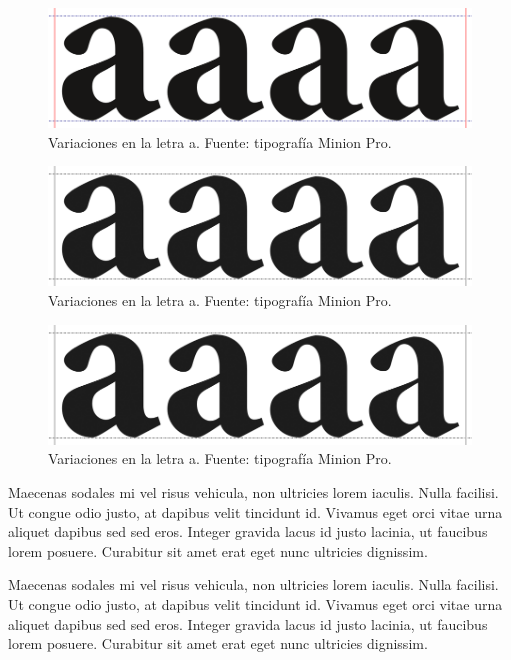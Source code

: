 \ifPDF
\begin{figure}[!ht]
\centering
\includegraphics[width=\textwidth]{./media/letraA.png}
\caption{Variaciones en la letra a. Fuente: tipografía Minion Pro.}\label{figura1-1}
\end{figure}
\else
\ifBNPDF
\begin{figure}[!ht]
	\centering
	\includegraphics[width=\textwidth]{./media/letraa.png}
	\caption{Variaciones en la letra a. Fuente: tipografía Minion Pro.}\label{figura1-1}
	\end{figure}
	\fi
		\else
		\ifPNGEPUB
		\begin{figure}[!ht]
		\centering
		\includegraphics[width=\textwidth]{./media/letraa.png}
		\caption{Variaciones en la letra a. Fuente: tipografía Minion Pro.}\label{figura1-1}
		\end{figure}
		\fi
\fi

Maecenas sodales mi vel risus vehicula, non ultricies lorem iaculis. Nulla facilisi. Ut congue odio justo, at dapibus velit tincidunt id. Vivamus eget orci vitae urna aliquet dapibus sed sed eros. Integer gravida lacus id justo lacinia, ut faucibus lorem posuere. Curabitur sit amet erat eget nunc ultricies dignissim.

Maecenas sodales mi vel risus vehicula, non ultricies lorem iaculis. Nulla facilisi. Ut congue odio justo, at dapibus velit tincidunt id. Vivamus eget orci vitae urna aliquet dapibus sed sed eros. Integer gravida lacus id justo lacinia, ut faucibus lorem posuere. Curabitur sit amet erat eget nunc ultricies dignissim.

